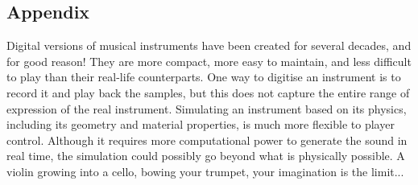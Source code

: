 \ifapp
  \renewcommand\thesection{\thechapter.\arabic{section}}
  \begin{subappendices}
    \begin{appendices}
      \part{Appendix}
         
    \end{appendices}
  \end{subappendices}
\fi
\pagebreak
\pagestyle{empty}
\justify
{}Digital versions of musical instruments have been created for several decades, and for good reason! They are more compact, more easy to maintain, and less difficult to play than their real-life counterparts. One way to digitise an instrument is to record it and play back the samples, but this does not capture the entire range of expression of the real instrument. Simulating an instrument based on its physics, including its geometry and material properties, is much more flexible to player control. Although it requires more computational power to generate the sound in real time, the simulation could possibly go beyond what is physically possible. A violin growing into a cello, bowing your trumpet, your imagination is the limit...

